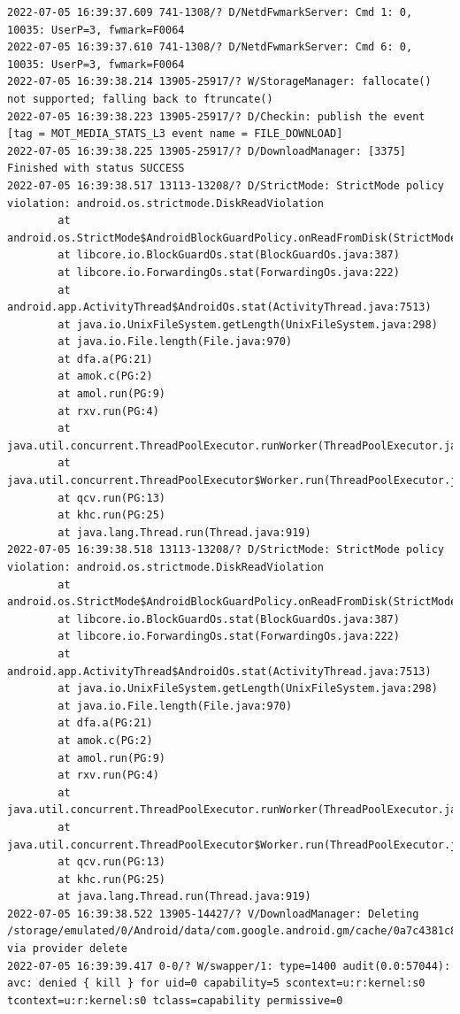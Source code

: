 \documentclass[a4paper,12pt]{book}
\begin{document}
\begin{lstlisting}
2022-07-05 16:39:37.609 741-1308/? D/NetdFwmarkServer: Cmd 1: 0, 10035: UserP=3, fwmark=F0064
2022-07-05 16:39:37.610 741-1308/? D/NetdFwmarkServer: Cmd 6: 0, 10035: UserP=3, fwmark=F0064
2022-07-05 16:39:38.214 13905-25917/? W/StorageManager: fallocate() not supported; falling back to ftruncate()
2022-07-05 16:39:38.223 13905-25917/? D/Checkin: publish the event [tag = MOT_MEDIA_STATS_L3 event name = FILE_DOWNLOAD]
2022-07-05 16:39:38.225 13905-25917/? D/DownloadManager: [3375] Finished with status SUCCESS
2022-07-05 16:39:38.517 13113-13208/? D/StrictMode: StrictMode policy violation: android.os.strictmode.DiskReadViolation
        at android.os.StrictMode$AndroidBlockGuardPolicy.onReadFromDisk(StrictMode.java:1571)
        at libcore.io.BlockGuardOs.stat(BlockGuardOs.java:387)
        at libcore.io.ForwardingOs.stat(ForwardingOs.java:222)
        at android.app.ActivityThread$AndroidOs.stat(ActivityThread.java:7513)
        at java.io.UnixFileSystem.getLength(UnixFileSystem.java:298)
        at java.io.File.length(File.java:970)
        at dfa.a(PG:21)
        at amok.c(PG:2)
        at amol.run(PG:9)
        at rxv.run(PG:4)
        at java.util.concurrent.ThreadPoolExecutor.runWorker(ThreadPoolExecutor.java:1167)
        at java.util.concurrent.ThreadPoolExecutor$Worker.run(ThreadPoolExecutor.java:641)
        at qcv.run(PG:13)
        at khc.run(PG:25)
        at java.lang.Thread.run(Thread.java:919)
2022-07-05 16:39:38.518 13113-13208/? D/StrictMode: StrictMode policy violation: android.os.strictmode.DiskReadViolation
        at android.os.StrictMode$AndroidBlockGuardPolicy.onReadFromDisk(StrictMode.java:1571)
        at libcore.io.BlockGuardOs.stat(BlockGuardOs.java:387)
        at libcore.io.ForwardingOs.stat(ForwardingOs.java:222)
        at android.app.ActivityThread$AndroidOs.stat(ActivityThread.java:7513)
        at java.io.UnixFileSystem.getLength(UnixFileSystem.java:298)
        at java.io.File.length(File.java:970)
        at dfa.a(PG:21)
        at amok.c(PG:2)
        at amol.run(PG:9)
        at rxv.run(PG:4)
        at java.util.concurrent.ThreadPoolExecutor.runWorker(ThreadPoolExecutor.java:1167)
        at java.util.concurrent.ThreadPoolExecutor$Worker.run(ThreadPoolExecutor.java:641)
        at qcv.run(PG:13)
        at khc.run(PG:25)
        at java.lang.Thread.run(Thread.java:919)
2022-07-05 16:39:38.522 13905-14427/? V/DownloadManager: Deleting /storage/emulated/0/Android/data/com.google.android.gm/cache/0a7c4381c8c7673914a3a76bfe4eb46f via provider delete
2022-07-05 16:39:39.417 0-0/? W/swapper/1: type=1400 audit(0.0:57044): avc: denied { kill } for uid=0 capability=5 scontext=u:r:kernel:s0 tcontext=u:r:kernel:s0 tclass=capability permissive=0

\end{lstlisting}
\end{document}
